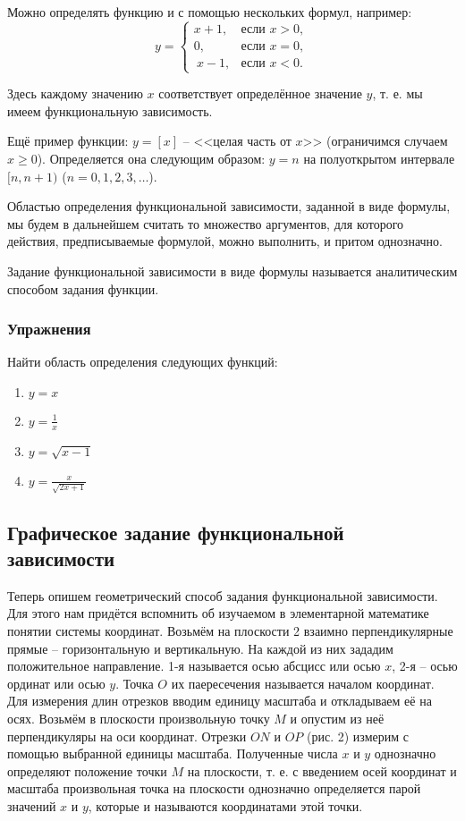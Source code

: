 Можно определять функцию и с помощью нескольких формул, например:
$$y = \begin{cases}
	x + 1, &\text{если $x > 0$,}\\
	0, &\text{если $x = 0$},\\\
	x - 1, &\text{если $x < 0$}.
\end{cases}$$

Здесь каждому значению $x$ соответствует определённое значение $y$, т. е. мы
имеем функциональную зависимость.

Ещё пример функции: $y = [x]$ -- <<целая часть от $x$>> (ограничимся случаем $x
\geq 0$). Определяется она следующим образом: $y = n$ на полуоткрытом интервале
$[n, n + 1)$ ($n = 0, 1, 2, 3, \ldots$).

Областью определения функциональной зависимости, заданной в виде формулы, мы
будем в дальнейшем считать то множество аргументов, для которого действия,
предписываемые формулой, можно выполнить, и притом однозначно.

Задание функциональной зависимости в виде формулы называется аналитическим
способом задания функции.

\subsubsection{Упражнения}
Найти область определения следующих функций:
\begin{enumerate}
	\item $y = x$
	\item $y = \frac{1}{x}$
	\item $y = \sqrt{x - 1}$
	\item $y = \frac{x}{\sqrt{2x + 1}}$
\end{enumerate}

\subsection{Графическое задание функциональной зависимости}
Теперь опишем геометрический способ задания функциональной зависимости. Для
этого нам придётся вспомнить об изучаемом в элементарной математике понятии
системы координат. Возьмём на плоскости 2 взаимно перпендикулярные прямые --
горизонтальную и вертикальную. На каждой из них зададим положительное
направление. 1-я называется осью абсцисс или осью $x$, 2-я -- осью ординат или
осью $y$. Точка $O$ их паересечения называется началом координат. Для измерения
длин отрезков вводим единицу масштаба и откладываем её на осях. Возьмём в
плоскости произвольную точку $M$ и опустим из неё перпендикуляры на оси
координат. Отрезки $ON$ и $OP$ (рис. 2) измерим с помощью выбранной единицы
масштаба. Полученные числа $x$ и $y$ однозначно определяют положение точки $M$
на плоскости, т. е. с введением осей координат и масштаба произвольная точка на
плоскости однозначно определяется парой значений $x$ и $y$, которые и
называются координатами этой точки.

